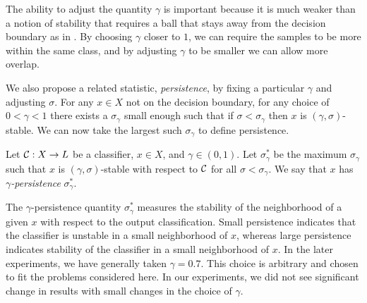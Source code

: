 The ability to adjust the quantity $\gamma$ is important because it is much weaker than a notion of stability that requires a ball that stays away from the decision boundary as in \cite{khoury2018}. By choosing $\gamma$ closer to $1$, we can require the samples to be more within the same class, and by adjusting $\gamma$ to be smaller we can allow more overlap.

We also propose a related statistic, \emph{persistence}, by fixing a particular $\gamma$ and adjusting $\sigma$. For any $x\in X$ not on the decision boundary, for any choice of $0<\gamma<1$ there exists a $\sigma_\gamma$ small enough such that if $\sigma < \sigma_\gamma$ then $x$ is $(\gamma,\sigma)$-stable. We can now take the largest such $\sigma_\gamma$ to define persistence.



\begin{definition}
    Let $\mathcal{C}:X\to L$ be a classifier, $x \in X$, and $\gamma\in(0,1)$. Let $\sigma_\gamma^*$ be the maximum $\sigma_\gamma$ such that $x$ is $(\gamma, \sigma)$-stable with respect to $\mathcal{C}$ for all $\sigma<\sigma_\gamma$. We say that $x$ has \emph{$\gamma$-persistence} $\sigma_\gamma^*$.
\end{definition}

The $\gamma$-persistence quantity $\sigma_\gamma^*$ measures the stability of the neighborhood of a given $x$ with respect to the output classification. Small persistence indicates that the classifier is unstable in a small neighborhood of $x$, whereas large persistence indicates stability of the classifier in a small neighborhood of $x$. In the later experiments, we have generally taken $\gamma = 0.7$. This choice is arbitrary and chosen to fit the problems considered here. In our experiments, we did not see significant change in results with small changes in the choice of $\gamma$.






